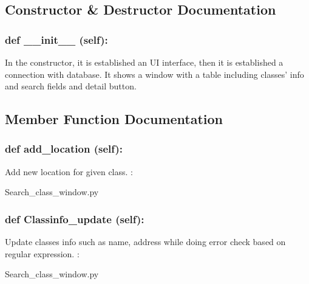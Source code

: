 \subsection{Constructor \& Destructor Documentation}
\hypertarget{class_poly_aa3def076b74bed67904976ad4f9fe9b1}{
\subsubsection[{def __init__ (self):}]{\setlength{\rightskip}{0pt plus 5cm}def {\_\_init\_\_} (self): 
}}
In the constructor, it is established an UI interface, then it is  established a connection with database. It shows a window with a table including classes' info and search fields and detail button. 
 

\subsection{Member Function Documentation}
\hypertarget{class_poly_a14a7ad77ce612b0c54f531d307ee4b39}{
\subsubsection[{def add_location (self):}]{\setlength{\rightskip}{0pt plus 5cm}def {add\_location} (self):}}\label{class_poly_a14a7ad77ce612b0c54f531d307ee4b39}
Add new location for given class.
:\begin{DoxyCompactItemize}
\item 
Search\_class\_window.\-py\end{DoxyCompactItemize}

\hypertarget{class_poly_a14a7ad77ce612b0c54f531d307ee4b39}{
\subsubsection[{def Classinfo_update (self):}]{\setlength{\rightskip}{0pt plus 5cm}def {Classinfo\_update} (self):}}\label{class_poly_a14a7ad77ce612b0c54f531d307ee4b39}
Update classes info such as name, address while doing error check based on regular expression. 
:\begin{DoxyCompactItemize}
\item 
Search\_class\_window.\-py\end{DoxyCompactItemize}

